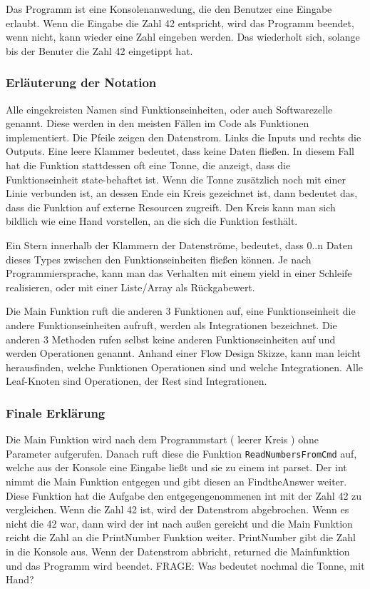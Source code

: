 \documentclass[11pt]{article}
\begin{document}
Das Programm ist eine Konsolenanwedung, die den Benutzer eine Eingabe erlaubt.
Wenn die Eingabe die Zahl 42 entspricht, wird das Programm beendet, wenn nicht, kann wieder eine Zahl eingeben werden.
Das wiederholt sich, solange bis der Benuter die Zahl 42 eingetippt hat.

\subsubsection{Erläuterung der Notation}
\label{sec:orgheadline51}
Alle eingekreisten Namen sind Funktionseinheiten, oder auch Softwarezelle genannt.
Diese werden in den meisten Fällen im Code als Funktionen implementiert.
Die Pfeile zeigen den Datenstrom. Links die Inputs und rechts die Outputs.
Eine leere Klammer bedeutet, dass keine Daten fließen.
In diesem Fall hat die Funktion stattdessen oft eine Tonne, die anzeigt, dass die Funktionseinheit state-behaftet ist.
Wenn die Tonne zusätzlich noch mit einer Linie verbunden ist, an dessen Ende ein Kreis gezeichnet ist,
dann bedeutet das, dass die Funktion auf externe Resourcen zugreift.
Den Kreis kann man sich bildlich wie eine Hand vorstellen, an die sich die Funktion festhält.

Ein Stern innerhalb der Klammern der Datenströme, bedeutet, dass 0..n Daten dieses Types zwischen
den Funktionseinheiten fließen können.
Je nach Programmiersprache, kann man das Verhalten mit einem yield in einer Schleife realisieren,
oder mit einer Liste/Array als Rückgabewert.

Die Main Funktion ruft die anderen 3 Funktionen auf, eine Funktionseinheit die andere Funktionseinheiten aufruft,
werden als Integrationen bezeichnet. Die anderen 3 Methoden rufen selbst keine anderen Funktionseinheiten auf und werden
Operationen genannt. Anhand einer Flow Design Skizze, kann man leicht herausfinden, welche Funktionen Operationen sind und welche
Integrationen.
Alle Leaf-Knoten sind Operationen, der Rest sind Integrationen.
\subsubsection{Finale Erklärung}
\label{sec:orgheadline52}
Die Main Funktion wird nach dem Programmstart ( leerer Kreis ) ohne Parameter aufgerufen.
Danach ruft diese die Funktion \texttt{ReadNumbersFromCmd} auf, welche aus der Konsole eine Eingabe ließt und sie
zu einem int parset. Der int nimmt die Main Funktion entgegen und gibt diesen an FindtheAnswer weiter.
Diese Funktion hat die Aufgabe den entgegengenommenen int mit der Zahl 42 zu vergleichen. Wenn die Zahl 42 ist, wird der Datenstrom
abgebrochen. Wenn es nicht die 42 war, dann wird der int nach außen gereicht und die Main Funktion reicht die Zahl an die
PrintNumber Funktion weiter. PrintNumber gibt die Zahl in die Konsole aus.
Wenn der Datenstrom abbricht, returned die Mainfunktion und das Programm wird beendet.
FRAGE: Was bedeutet nochmal die Tonne, mit Hand?
\end{document}
